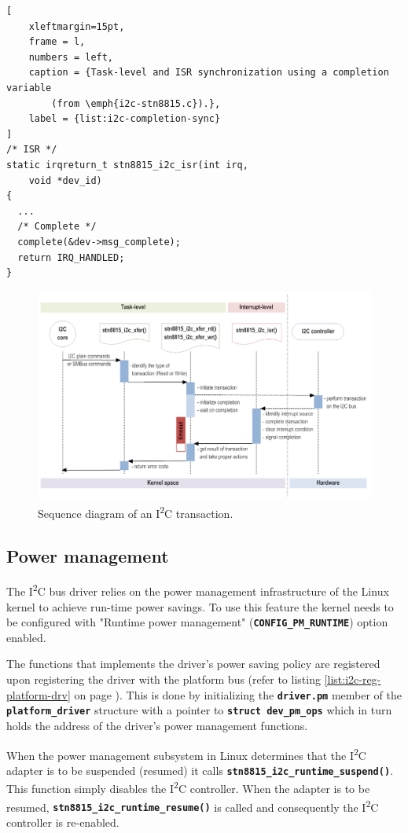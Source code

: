 \documentclass[a4paper,10pt]{article}
\newcommand{\iic}{I\textsuperscript{2}C }
\newcommand{\keyword}[1]{\texttt{\textbf{#1}}}
\begin{document}
\begin{multicols}{2}
\begin{lstlisting}[
	xleftmargin=15pt,
	frame = l,
	numbers = left,
	caption = {Task-level and ISR synchronization using a completion variable
		(from \emph{i2c-stn8815.c}).},
	label = {list:i2c-completion-sync}
]
/* ISR */
static irqreturn_t stn8815_i2c_isr(int irq,
	void *dev_id)
{
  ...
  /* Complete */
  complete(&dev->msg_complete);
  return IRQ_HANDLED;
}

\end{lstlisting}

\begin{figure}
 \centering
 \includegraphics[width=16cm]
 	{./figures/i2c-data-transfer-seq-diag.png}
 \caption{Sequence diagram of an \iic transaction.}
 \label{fig:i2c-trans-seq-diag}
\end{figure}


\subsection{Power management}
\label{sec:adapter_power_management}

The \iic bus driver relies on the power management infrastructure of the Linux
kernel to achieve run-time power savings. To use this feature the kernel needs
to be configured with "Runtime power management" (\keyword{CONFIG\_PM\_RUNTIME})
option enabled.

The functions that implements the driver's power saving policy are registered
upon registering the driver with the platform bus (refer to listing
\ref{list:i2c-reg-platform-drv} on page \pageref{list:i2c-reg-platform-drv}).
This is done by initializing the \keyword{driver.pm} member of the
\keyword{platform\_driver} structure with a pointer to
\keyword{struct dev\_pm\_ops} which in turn holds the address of the driver's
power management functions.

When the power management subsystem in Linux determines that the \iic adapter
is to be suspended (resumed) it calls \keyword{stn8815\_i2c\_runtime\_suspend()}.
This function simply disables the \iic controller.  
When the adapter is to be resumed, \keyword{stn8815\_i2c\_runtime\_resume()} is 
called and consequently the \iic controller is re-enabled.


\end{multicols}
\end{document}
